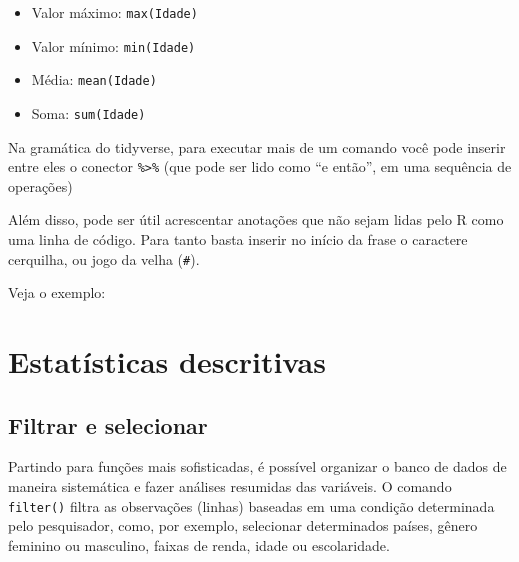 \documentclass[
  10pt,
  brazil,
  a4paper,
  twoside, notitlepage, openright]{book}
\newenvironment{Shaded}{\begin{snugshade}}{\end{snugshade}}
\newcommand{\CommentTok}[1]{\textcolor[rgb]{0.56,0.35,0.01}{\textit{#1}}}
\newcommand{\DataTypeTok}[1]{\textcolor[rgb]{0.13,0.29,0.53}{#1}}
\newcommand{\KeywordTok}[1]{\textcolor[rgb]{0.13,0.29,0.53}{\textbf{#1}}}
\newcommand{\NormalTok}[1]{#1}
\newcommand{\OperatorTok}[1]{\textcolor[rgb]{0.81,0.36,0.00}{\textbf{#1}}}
\newcommand{\OtherTok}[1]{\textcolor[rgb]{0.56,0.35,0.01}{#1}}
\newcommand{\StringTok}[1]{\textcolor[rgb]{0.31,0.60,0.02}{#1}}
\providecommand{\tightlist}{%
  \setlength{\itemsep}{0pt}\setlength{\parskip}{0pt}}
\begin{document}
\begin{itemize}
\tightlist
\item
  Valor máximo: \texttt{max(Idade)}
\item
  Valor mínimo: \texttt{min(Idade)}
\item
  Média: \texttt{mean(Idade)}
\item
  Soma: \texttt{sum(Idade)}
\end{itemize}

Na gramática do tidyverse, para executar mais de um comando você pode inserir entre eles o conector \texttt{\%\textgreater{}\%} (que pode ser lido como ``e então'', em uma sequência de operações)

Além disso, pode ser útil acrescentar anotações que não sejam lidas pelo R como uma linha de código. Para tanto basta inserir no início da frase o caractere cerquilha, ou jogo da velha (\texttt{\#}).

Veja o exemplo:

\begin{Shaded}
\end{Shaded}

\hypertarget{estatuxedsticas-descritivas}{%
\section{Estatísticas descritivas}\label{estatuxedsticas-descritivas}}

\hypertarget{filtrar-e-selecionar}{%
\subsection{Filtrar e selecionar}\label{filtrar-e-selecionar}}

Partindo para funções mais sofisticadas, é possível organizar o banco de dados de maneira sistemática e fazer análises resumidas das variáveis. O comando \texttt{filter()} filtra as observações (linhas) baseadas em uma condição determinada pelo pesquisador, como, por exemplo, selecionar determinados países, gênero feminino ou masculino, faixas de renda, idade ou escolaridade.
\end{document}
